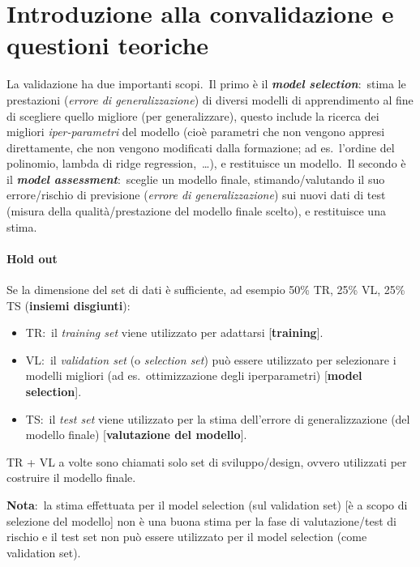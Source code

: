 \chapter{Introduzione alla convalidazione e questioni teoriche}

La validazione ha due importanti scopi.\
Il primo è il \textbf{\textit{model selection}}:\ stima le prestazioni (\textit{errore di generalizzazione}) di diversi modelli di apprendimento al fine di scegliere quello migliore (per generalizzare), questo include la ricerca dei migliori \textit{iper-parametri} del modello (cioè parametri che non vengono appresi direttamente, che non vengono modificati dalla formazione; ad es.\ l'ordine del polinomio, lambda di ridge regression,\ \dots), e restituisce un modello.\
Il secondo è il \textbf{\textit{model assessment}}:\ sceglie un modello finale, stimando/valutando il suo errore/rischio di previsione (\textit{errore di generalizzazione}) sui nuovi dati di test (misura della qualità/prestazione del modello finale scelto), e restituisce una stima.\

\subsubsection{Hold out}

Se la dimensione del set di dati è sufficiente, ad esempio 50\% TR, 25\% VL, 25\% TS (\textbf{insiemi disgiunti}):

\begin{itemize}
	\item TR:\ il \textit{training set} viene utilizzato per adattarsi [\textbf{training}].
	\item VL:\ il \textit{validation set} (o \textit{selection set}) può essere utilizzato per selezionare i modelli migliori (ad es.\ ottimizzazione degli iperparametri) [\textbf{model selection}].
	\item TS:\ il \textit{test set} viene utilizzato per la stima dell'errore di generalizzazione (del modello finale) [\textbf{valutazione del modello}].
\end{itemize}

\noindent TR + VL a volte sono chiamati solo set di sviluppo/design, ovvero utilizzati per costruire il modello finale.\

\textbf{Nota}:\ la stima effettuata per il model selection (sul validation set) [è a scopo di selezione del modello] non è una buona stima per la fase di valutazione{\slash}test di rischio e il test set non può essere utilizzato per il model selection (come validation set).

